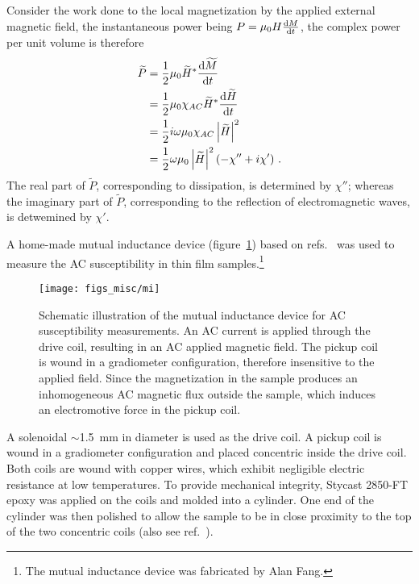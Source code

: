 Consider the work done to the local magnetization by the applied external magnetic field, the instantaneous power being $P = \mu_0H\frac{\mathop{}\!\mathrm{d} M}{\mathop{}\!\mathrm{d} t}$, the complex power per unit volume is therefore%
\begin{align}%
    \widetilde{P} &= \frac{1}{2}\mu_0 \widetilde{H}^* \frac{\diff \widetilde{M}}{\diff t}\nonumber\\
        &= \frac{1}{2}\mu_0\chi_{AC}\widetilde{H}^*\frac{\diff \widetilde{H}}{\diff t}\nonumber\\
        &= \frac{1}{2}i\omega\mu_0\chi_{AC}\left|\widetilde{H}\right|^2\nonumber\\
        &= \frac{1}{2}\omega\mu_0\left|\widetilde{H}\right|^2(-\chi''+i\chi')\label{eq:acm_power}~.
\end{align}%
The real part of $\widetilde{P}$, corresponding to dissipation, is determined by $\chi''$; whereas the imaginary part of $\widetilde{P}$, corresponding to the reflection of electromagnetic waves, is detwemined by $\chi'$.

A home-made mutual inductance device (figure~\ref{fig:mi_sketch}) based on refs.~\cite{Jeanneret1989} was used to measure the AC susceptibility in thin film samples.\footnote{The mutual inductance device was fabricated by Alan Fang.} %
\begin{figure}[ht]%
	\centering%
    \texttt{[image: figs\_misc/mi]}%
    \caption[Mutual inductance device for AC susceptibility measurements]{\label{fig:mi_sketch}Schematic illustration of the mutual inductance device for AC susceptibility measurements. An AC current is applied through the drive coil, resulting in an AC applied magnetic field. The pickup coil is wound in a gradiometer configuration, therefore insensitive to the applied field. Since the magnetization in the sample produces an inhomogeneous AC magnetic flux outside the sample, which induces an electromotive force in the pickup coil.}%
\end{figure}%
%
A solenoidal $\sim$\SI{1.5}{mm} in diameter is used as the drive coil. A pickup coil is wound in a gradiometer configuration and placed concentric inside the drive coil. Both coils are wound with copper wires, which exhibit negligible electric resistance at low temperatures. To provide mechanical integrity, Stycast 2850-FT epoxy was applied on the coils and molded into a cylinder. One end of the cylinder was then polished to allow the sample to be in close proximity to the top of the two concentric coils (also see ref.~\cite{YazdaniThesis}).

